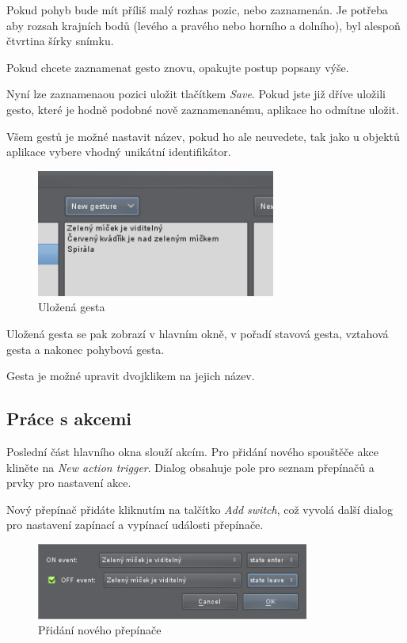 Pokud pohyb bude mít příliš malý rozhas pozic, nebo zaznamenán. Je potřeba aby
rozsah krajních bodů (levého a pravého nebo horního a dolního), byl alespoň
čtvrtina šírky snímku.

Pokud chcete zaznamenat gesto znovu, opakujte postup popsany výše.

Nyní lze zaznamenaou pozici uložit tlačítkem \emph{Save}. Pokud jste již dříve
uložili gesto, které je hodně podobné nově zaznamenanému, aplikace ho odmítne
uložit.

\bigskip
Všem gestů je možné nastavit název, pokud ho ale neuvedete, tak jako u objektů
aplikace vybere vhodný unikátní identifikátor.

\begin{figure}[H]
\centering
\includegraphics[width=0.7\textwidth]{gestures.png}
\caption{Uložená gesta}
\label{fig:gestures}
\end{figure}

\bigskip
Uložená gesta se pak zobrazí v hlavním okně, v pořadí stavová gesta, vztahová
gesta a nakonec pohybová gesta.

Gesta je možné upravit dvojklikem na jejich název.

\subsection{Práce s akcemi}
Poslední část hlavního okna slouží akcím. Pro přidání nového spouštěče akce
kliněte na \emph{New action trigger}. Dialog obsahuje pole pro seznam
přepínačů a prvky pro nastavení akce.

Nový přepínač přidáte kliknutím na talčítko \emph{Add switch}, což vyvolá
další dialog pro nastavení zapínací a vypínací události přepínače.

\begin{figure}[H]
\centering
\includegraphics[width=0.8\textwidth]{addswitch.png}
\caption{Přidání nového přepínače}
\label{fig:addswitch}
\end{figure}

